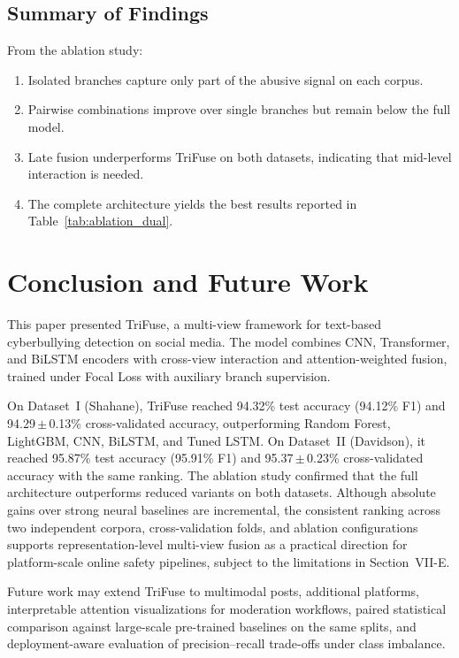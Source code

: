\subsection{Summary of Findings}

From the ablation study:
\begin{enumerate}
\item Isolated branches capture only part of the abusive signal on each corpus.
\item Pairwise combinations improve over single branches but remain below the full model.
\item Late fusion underperforms TriFuse on both datasets, indicating that mid-level interaction is needed.
\item The complete architecture yields the best results reported in Table~\ref{tab:ablation_dual}.
\end{enumerate}

\section{Conclusion and Future Work}

This paper presented TriFuse, a multi-view framework for text-based cyberbullying detection on social media. The model combines CNN, Transformer, and BiLSTM encoders with cross-view interaction and attention-weighted fusion, trained under Focal Loss with auxiliary branch supervision.

On Dataset~I (Shahane), TriFuse reached 94.32\% test accuracy (94.12\% F1) and 94.29\,$\pm$\,0.13\% cross-validated accuracy, outperforming Random Forest, LightGBM, CNN, BiLSTM, and Tuned LSTM. On Dataset~II (Davidson), it reached 95.87\% test accuracy (95.91\% F1) and 95.37\,$\pm$\,0.23\% cross-validated accuracy with the same ranking. The ablation study confirmed that the full architecture outperforms reduced variants on both datasets. Although absolute gains over strong neural baselines are incremental, the consistent ranking across two independent corpora, cross-validation folds, and ablation configurations supports representation-level multi-view fusion as a practical direction for platform-scale online safety pipelines, subject to the limitations in Section~VII-E.

Future work may extend TriFuse to multimodal posts, additional platforms, interpretable attention visualizations for moderation workflows, paired statistical comparison against large-scale pre-trained baselines on the same splits, and deployment-aware evaluation of precision--recall trade-offs under class imbalance.

